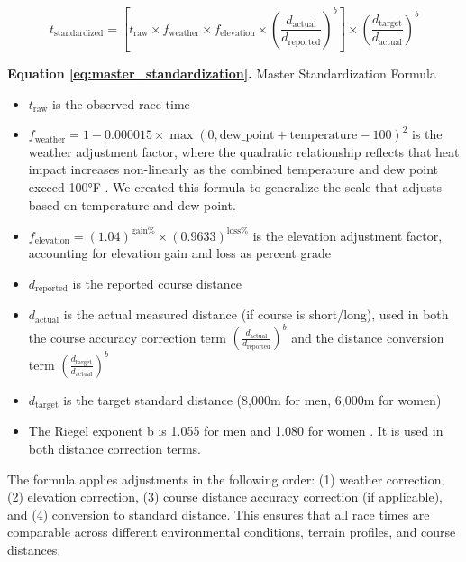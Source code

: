 \documentclass[suppldata]{interact}
\theoremstyle{plain}%
\theoremstyle{definition}
\theoremstyle{remark}
\begin{document}
\begin{equation}
t_{\text{standardized}} = \left[ t_{\text{raw}} \times f_{\text{weather}} \times f_{\text{elevation}} \times \left(\frac{d_{\text{actual}}}{d_{\text{reported}}}\right)^{b} \right] \times \left(\frac{d_{\text{target}}}{d_{\text{actual}}}\right)^{b}
\label{eq:master_standardization}
\end{equation}

\noindent\textbf{Equation \ref{eq:master_standardization}.} Master Standardization Formula

\begin{itemize}
    \item \(t_{\text{raw}}\) is the observed race time
    \item \(f_{\text{weather}} = 1 - 0.000015 \times \max(0, \text{dew\_point} + \text{temperature} - 100)^2\) is the weather adjustment factor, where the quadratic relationship reflects that heat impact increases non-linearly as the combined temperature and dew point exceed 100°F \cite{MaxPerformanceRunning}. We created this formula to generalize the scale that adjusts based on temperature and dew point.
    \item \(f_{\text{elevation}} = (1.04)^{\text{gain\%}} \times (0.9633)^{\text{loss\%}}\) is the elevation adjustment factor, accounting for elevation gain and loss as percent grade \cite{maurer2018race}
    \item \(d_{\text{reported}}\) is the reported course distance
    \item \(d_{\text{actual}}\) is the actual measured distance (if course is short/long), used in both the course accuracy correction term \(\left(\frac{d_{\text{actual}}}{d_{\text{reported}}}\right)^{b}\) and the distance conversion term \(\left(\frac{d_{\text{target}}}{d_{\text{actual}}}\right)^{b}\)
    \item \(d_{\text{target}}\) is the target standard distance (8,000m for men, 6,000m for women)
    \item The Riegel exponent b is 1.055 for men and 1.080 for women \cite{riegel1981athletic}. It is used in both distance correction terms.

\end{itemize}

The formula applies adjustments in the following order: (1) weather correction, (2) elevation correction, (3) course distance accuracy correction (if applicable), and (4) conversion to standard distance. This ensures that all race times are comparable across different environmental conditions, terrain profiles, and course distances.
\end{document}
